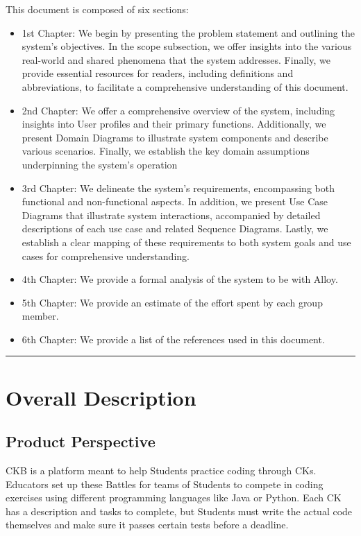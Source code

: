 \documentclass{Configuration_Files/Template}
\begin{document}
This document is composed of six sections:

\begin{itemize}
\item \textcolor{bluepoli}{1st Chapter:} We begin by presenting the problem statement and outlining the system's objectives. In the scope subsection, we offer insights into the various real-world and shared phenomena that the system addresses. Finally, we provide essential resources for readers, including definitions and abbreviations, to facilitate a comprehensive understanding of this document.
\item \textcolor{bluepoli}{2nd Chapter:} We offer a comprehensive overview of the system, including insights into User profiles and their primary functions. Additionally, we present Domain Diagrams to illustrate system components and describe various scenarios. Finally, we establish the key domain assumptions underpinning the system's operation
\item \textcolor{bluepoli}{3rd Chapter:} We delineate the system's requirements, encompassing both functional and non-functional aspects. In addition, we present Use Case Diagrams that illustrate system interactions, accompanied by detailed descriptions of each use case and related Sequence Diagrams. Lastly, we establish a clear mapping of these requirements to both system goals and use cases for comprehensive understanding.
\item \textcolor{bluepoli}{4th Chapter:} We provide a formal analysis of the system to be with Alloy.
\item \textcolor{bluepoli}{5th Chapter:} We provide an estimate of the effort spent by each group member.
\item \textcolor{bluepoli}{6th Chapter:} We provide a list of the references used in this document.
\end{itemize}

{\color{bluepoli}\rule{\linewidth}{0.1pt}}

\chapter{Overall Description}

\section{Product Perspective}

CKB is a platform meant to help Students practice coding through CKs. Educators set up these Battles for teams of Students to compete in coding exercises using different programming languages like Java or Python. Each CK has a description and tasks to complete, but Students must write the actual code themselves and make sure it passes certain tests before a deadline.
\end{document}
